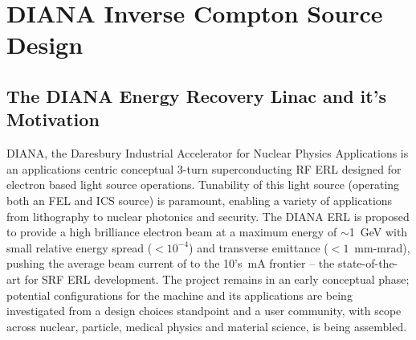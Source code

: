 \documentclass[../main.tex]{subfiles}
\begin{document}
\chapter{DIANA Inverse Compton Source Design}
\label{DIANA_Inverse_Compton_Source_Design} %

\section{The DIANA Energy Recovery Linac and it's Motivation}

DIANA, the Daresbury Industrial Accelerator for Nuclear Physics Applications is an applications centric conceptual 3-turn superconducting RF ERL designed for electron based light source operations. Tunability of this light source (operating both an FEL and ICS source) is paramount, enabling a variety of applications from lithography to nuclear photonics and security. The DIANA ERL is proposed to provide a high brilliance electron beam at a maximum energy of $\sim$1~\si{\giga\electronvolt} with small relative energy spread ($< 10^{-4}$) and transverse emittance ($< 1$~\si{\milli\meter}-\si{\milli\radian}), pushing the average beam current of to the 10's~\si{\milli\ampere} frontier -- the state-of-the-art for SRF ERL development. The project remains in an early conceptual phase; potential configurations for the machine and its applications are being investigated from a design choices standpoint and a user community, with scope across nuclear, particle, medical physics and material science, is being assembled.  
\end{document}

